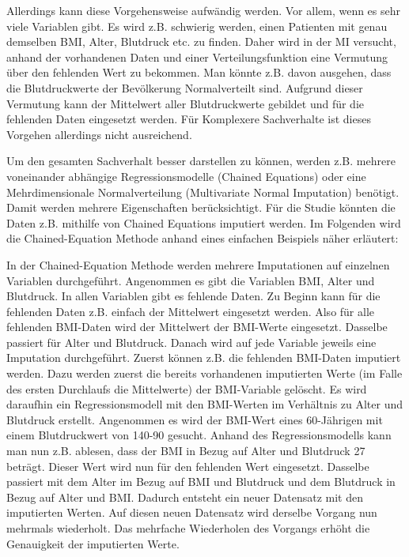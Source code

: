 Allerdings kann diese Vorgehensweise aufwändig werden. Vor allem, wenn es sehr viele Variablen gibt. Es wird z.B. 
schwierig werden, einen Patienten mit genau demselben BMI, Alter, Blutdruck etc. zu finden. Daher wird in 
der MI versucht, anhand der vorhandenen Daten und einer Verteilungsfunktion eine Vermutung über den fehlenden Wert zu 
bekommen. Man könnte z.B. davon ausgehen, dass die Blutdruckwerte der Bevölkerung Normalverteilt sind. Aufgrund dieser Vermutung 
kann der Mittelwert aller Blutdruckwerte gebildet und für die fehlenden Daten eingesetzt werden. Für Komplexere Sachverhalte ist 
dieses Vorgehen allerdings nicht ausreichend. \autocite[1089]{Donders2006}

Um den gesamten Sachverhalt besser darstellen zu können, werden z.B. mehrere voneinander abhängige Regressionsmodelle 
(Chained Equations) oder eine Mehrdimensionale Normalverteilung (Multivariate Normal Imputation) benötigt. \autocite[489]{Spratt2010} Damit 
werden mehrere Eigenschaften berücksichtigt. Für die Studie könnten die Daten z.B. mithilfe von Chained Equations imputiert werden. Im Folgenden wird
die Chained-Equation Methode anhand eines einfachen Beispiels näher erläutert:

In der Chained-Equation Methode werden mehrere Imputationen auf einzelnen Variablen durchgeführt. Angenommen es gibt die Variablen BMI, Alter und Blutdruck. 
In allen Variablen gibt es fehlende Daten. Zu Beginn kann für die fehlenden Daten z.B. einfach der Mittelwert eingesetzt werden. Also für alle fehlenden 
BMI-Daten wird der Mittelwert der BMI-Werte eingesetzt. Dasselbe passiert für Alter und Blutdruck. Danach wird auf jede Variable jeweils eine Imputation durchgeführt. 
Zuerst können z.B. die fehlenden BMI-Daten imputiert werden. Dazu werden zuerst die bereits vorhandenen imputierten Werte (im Falle des ersten Durchlaufs die Mittelwerte)
der BMI-Variable gelöscht. Es wird daraufhin ein Regressionsmodell mit den BMI-Werten im Verhältnis zu Alter und Blutdruck erstellt. Angenommen es wird der BMI-Wert
eines 60-Jährigen mit einem Blutdruckwert von 140-90 gesucht. Anhand des Regressionsmodells kann man nun z.B. ablesen, dass der BMI in Bezug auf Alter und Blutdruck 27 beträgt.
Dieser Wert wird nun für den fehlenden Wert eingesetzt. Dasselbe passiert mit dem Alter im Bezug auf BMI und Blutdruck und dem Blutdruck in Bezug auf Alter und BMI. Dadurch
entsteht ein neuer Datensatz mit den imputierten Werten. Auf diesen neuen Datensatz wird derselbe Vorgang nun mehrmals wiederholt. \autocite[108]{Tilling2016}
Das mehrfache Wiederholen des Vorgangs erhöht die Genauigkeit der imputierten Werte.  


